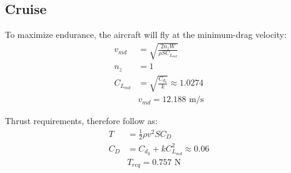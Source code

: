 \documentclass[a4paper,man,natbib]{apa6}
\begin{document}
\subsection{Cruise}
To maximize endurance, the aircraft will fly at the minimum-drag velocity:
\begin{align*}
    v_{md} &= \sqrt{\frac{2n_zW}{\rho S C_{L_{md}}}}\\
    n_z &= 1\\
    C_{L_{md}} &= \sqrt{\frac{C_{d_0}}{k}} \approx 1.0274\\
    &\boxed{v_{md} = 12.188 \text{ m/s}}
\end{align*}

Thrust requirements, therefore follow as:
\begin{align*}
    T &= \frac{1}{2}\rho v^2 S C_D\\
    C_D &= C_{d_0} + kC_{L_{md}}^2 \approx 0.06\\
    &\boxed{T_{req} = 0.757 \text{ N}}
\end{align*}
\end{document}
